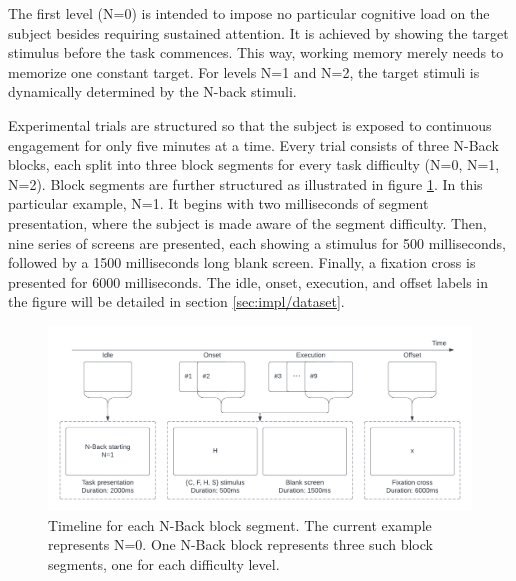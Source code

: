 The first level (N=0) is intended to impose no particular cognitive load on the subject besides requiring sustained attention. It is achieved by showing the target stimulus before the task commences. This way, working memory merely needs to memorize one constant target. For levels N=1 and N=2, the target stimuli is dynamically determined by the N-back stimuli.

Experimental trials are structured so that the subject is exposed to continuous engagement for only five minutes at a time. Every trial consists of three N-Back blocks, each split into three block segments for every task difficulty (N=0, N=1, N=2). Block segments are further structured as illustrated in figure \ref{fig:impl/NBackBlockSeg}. In this particular example, N=1. It begins with two milliseconds of segment presentation, where the subject is made aware of the segment difficulty. Then, nine series of screens are presented, each showing a stimulus for 500 milliseconds, followed by a 1500 milliseconds long blank screen. Finally, a fixation cross is presented for 6000 milliseconds. The idle, onset, execution, and offset labels in the figure will be detailed in section \ref{sec:impl/dataset}.


\begin{figure}[h]
    \centering
    \includegraphics[width=\textwidth]{figures/impl_NBackBlock.png}
    \caption{Timeline for each N-Back block segment. The current example represents N=0. One N-Back block represents three such block segments, one for each difficulty level.}
    \label{fig:impl/NBackBlockSeg}
\end{figure}


